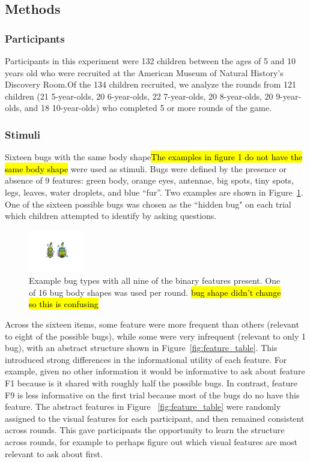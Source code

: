\documentclass[10pt,letterpaper]{article}
\begin{document}
\subsection{Methods}

\subsubsection{Participants}

Participants in this experiment were 132 children between the ages of 5 and 10 
years old who were recruited at the American Museum of Natural History's 
Discovery Room.Of the 134 children recruited, we analyze the rounds from 121 
children (21 5-year-olds, 20 6-year-olds, 22 7-year-olds, 20 8-year-olds, 20 9-year-olds, 
and 18 10-year-olds) who completed 5 or more rounds of the game.

\subsubsection{Stimuli}

Sixteen bugs with the same body shape\hl{The examples in figure 1 do not have the
same body shape} were used as 
stimuli. Bugs were defined by the presence or absence of 9 features: green body, 
orange eyes, antennae, big spots, tiny spots, legs, leaves, water droplets, and blue 
``fur''. Two examples are shown in Figure~\ref{fig:example_bugs}.  One of the
sixteen possible bugs was chosen as the ``hidden bug" on each trial which 
children attempted to identify by asking questions.


\begin{figure}[h]
  \centering
  \includegraphics[width=0.22\textwidth]{figures/example_bugs}
  \caption{Example bug types with all nine of the binary features present. One of 16 
bug body shapes was used per round. \hl{bug shape didn't change so this is
confusing}}
  \label{fig:example_bugs}
\end{figure} 

Across the sixteen items, some feature were more frequent than others (relevant to eight of the possible
bugs), while some were very infrequent (relevant to only 1 bug), with an
abstract structure shown in Figure~\ref{fig:feature_table}. This introduced
strong differences in the informational utility of each feature.  For example,
given no other information it would be informative to ask about feature F1
because is it shared with roughly half the possible bugs.  In contrast, feature
F9 is less informative on the first trial because most of the bugs do no have this
feature. The abstract features in Figure~
\ref{fig:feature_table} were randomly assigned to the visual features for each 
participant, and then remained consistent across rounds. This gave participants the 
opportunity to learn the structure across rounds, for example to perhaps figure out 
which visual features are most relevant to ask about first.
\end{document}
